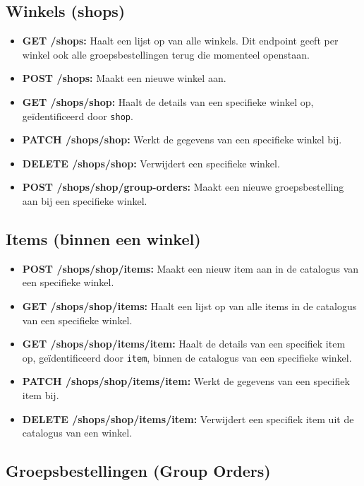 \subsection{Winkels (shops)}

\begin{itemize}
  \item \textbf{GET /shops:} Haalt een lijst op van alle winkels. Dit endpoint geeft per winkel ook alle groepsbestellingen terug die momenteel openstaan.
  \item \textbf{POST /shops:} Maakt een nieuwe winkel aan.
  \item \textbf{GET /shops/{shop}:} Haalt de details van een specifieke winkel op, geïdentificeerd door \texttt{{shop}}.
  \item \textbf{PATCH /shops/{shop}:} Werkt de gegevens van een specifieke winkel bij.
  \item \textbf{DELETE /shops/{shop}:} Verwijdert een specifieke winkel.
  \item \textbf{POST /shops/{shop}/group-orders:} Maakt een nieuwe groepsbestelling aan bij een specifieke winkel.
\end{itemize}

\subsection{Items (binnen een winkel)}

\begin{itemize}
  \item \textbf{POST /shops/{shop}/items:} Maakt een nieuw item aan in de catalogus van een specifieke winkel.
  \item \textbf{GET /shops/{shop}/items:} Haalt een lijst op van alle items in de catalogus van een specifieke winkel.
  \item \textbf{GET /shops/{shop}/items/{item}:} Haalt de details van een specifiek item op, geïdentificeerd door \texttt{{item}}, binnen de catalogus van een specifieke winkel.
  \item \textbf{PATCH /shops/{shop}/items/{item}:} Werkt de gegevens van een specifiek item bij.
  \item \textbf{DELETE /shops/{shop}/items/{item}:} Verwijdert een specifiek item uit de catalogus van een winkel.
\end{itemize}

\subsection{Groepsbestellingen (Group Orders)}

